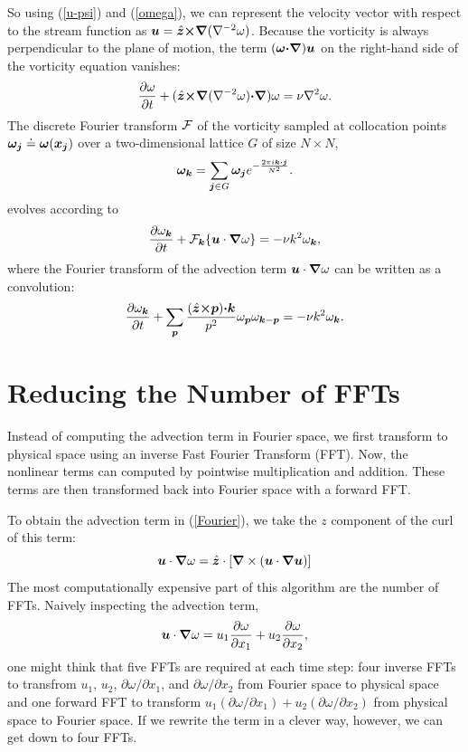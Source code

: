 \documentclass[12pt]{article}
\def\v{\bm}
\def\lap{{\nabla}^2}
\def\lapinv{{\nabla}^{-2}}
\def\vw{{\v\w}}
\def\Eq#1{(\ref{#1})}
\begin{document}
So using \Eq{u-psi} and \Eq{omega}, we can represent the velocity
vector with respect to the stream function as
$\vu=\hat{\vz}\cross\grad(\lapinv\omega)$.
Because the vorticity is always perpendicular to the plane of motion,
the term $(\vw\dot\grad)\vu$ on the right-hand side of the vorticity equation vanishes:
$$\frac{\partial \omega}{\partial t} + (\hat{\vz}\cross\grad(\lapinv\omega)\dot\grad)\omega= \nu\lap\omega .$$
The discrete Fourier transform ${\cal F}$ of the vorticity sampled at collocation
points $\vw_\vj\doteq\vw(\vx_\vj)$ over a two-dimensional lattice
$G$ of size $N\times N$,
$$
\vw_{\vk}=\sum_{\vj\in G} \vw_\vj e^{-\fr{2\pi i\vk\dot\vj}{N^2}}.
$$
evolves according to
\begin{equation}\label{Fourier}
\frac{\partial\omega_{\vk}}{\partial t} + {\cal F}_\vk\{\vu\cdot\grad\omega\}= -\nu k^2\omega_{\vk},
\end{equation}
where the Fourier transform of the advection term
$\vu\cdot\grad\omega$ can be written as a convolution:
\begin{equation}\label{Fourier-expand}
\frac{\partial\omega_{\vk}}{\partial t} + \sum_{\vp}{\frac{(\hat{\vz}\cross\vp)\dot\vk}{p^2}\omega_{\vp}\omega_{\vk-\vp}}= -\nu k^2\omega_{\vk}.
\end{equation}


\section{Reducing the Number of FFTs}
Instead of computing the advection term in Fourier space, we first transform to physical space using an inverse Fast Fourier Transform (FFT). Now, the nonlinear terms can computed by pointwise multiplication and addition. These terms are then transformed back into Fourier space with a forward FFT.

To obtain the advection term in \Eq{Fourier}, we take the $z$ component of the curl of this term:
\begin{equation}
\vu\cdot\grad\omega =\hat{\vz}\cdot \left[\grad \times \left(\vu\cdot\grad\vu \right)\right]
\end{equation}
The most computationally expensive part of this algorithm are the number of FFTs. Naively inspecting the advection term,
\begin{equation}
\vu\cdot\grad\omega = u_1\frac{\partial \omega}{\partial x_1}+u_2\frac{\partial \omega}{\partial x_2},
\end{equation}
one might think that five FFTs are required at each time step: four
inverse FFTs to transfrom $u_1$, $ u_2$, $\partial \omega/\partial x_1$, and $\partial \omega/\partial x_2$ from Fourier space to physical space and one forward FFT to transform $u_1\left(\partial \omega/\partial x_1\right)+u_2\left(\partial \omega/\partial x_2\right)$ from physical space to Fourier space. If we rewrite the term in a clever way, however, we can get down to four FFTs.
\end{document}
